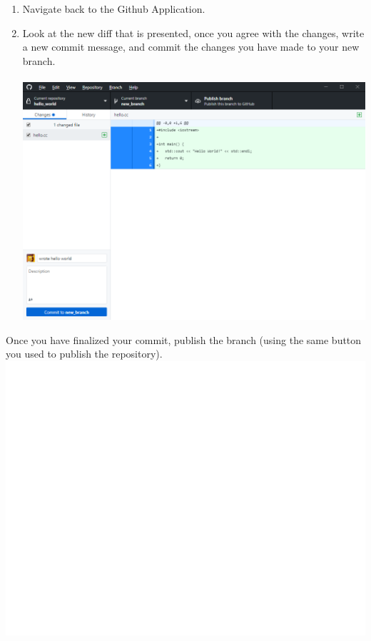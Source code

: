 \documentclass[12pt, letter]{article}
\begin{document}
    \begin{enumerate}
        \item Navigate back to the Github Application.

        \item Look at the new diff that is presented, once you agree with the changes, write a new commit message, and commit the changes you have made to your new branch. \\ \\ %
        \includegraphics{screenshots/shot8.bmp}
    \end{enumerate}
    Once you have finalized your commit, publish the branch (using the same button you used to publish the repository). \\

    \includegraphics{screenshots/shot08.bmp}
\end{document}
